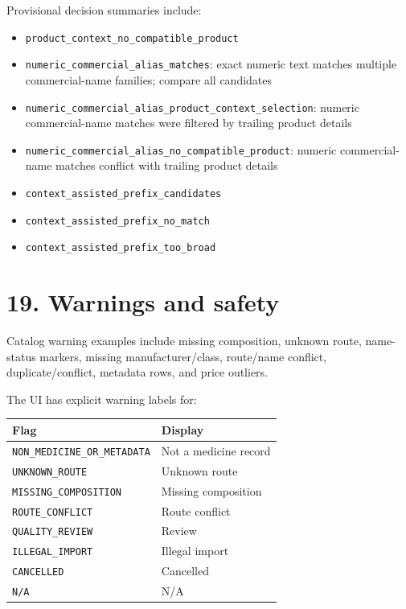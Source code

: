 Provisional decision summaries include:

\begin{itemize}
\tightlist
\item
  \texttt{product\_\allowbreak{}context\_\allowbreak{}no\_\allowbreak{}compatible\_\allowbreak{}product}
\item
  \texttt{numeric\_\allowbreak{}commercial\_\allowbreak{}alias\_\allowbreak{}matches}: exact numeric text matches multiple commercial-name families; compare all candidates
\item
  \texttt{numeric\_\allowbreak{}commercial\_\allowbreak{}alias\_\allowbreak{}product\_\allowbreak{}context\_\allowbreak{}selection}: numeric commercial-name matches were filtered by trailing product details
\item
  \texttt{numeric\_\allowbreak{}commercial\_\allowbreak{}alias\_\allowbreak{}no\_\allowbreak{}compatible\_\allowbreak{}product}: numeric commercial-name matches conflict with trailing product details
\item
  \texttt{context\_\allowbreak{}assisted\_\allowbreak{}prefix\_\allowbreak{}candidates}
\item
  \texttt{context\_\allowbreak{}assisted\_\allowbreak{}prefix\_\allowbreak{}no\_\allowbreak{}match}
\item
  \texttt{context\_\allowbreak{}assisted\_\allowbreak{}prefix\_\allowbreak{}too\_\allowbreak{}broad}
\end{itemize}

\section{19. Warnings and safety}\label{19-warnings-and-safety}

Catalog warning examples include missing composition, unknown route, name-status markers, missing manufacturer/class, route/name conflict, duplicate/conflict, metadata rows, and price outliers.

The UI has explicit warning labels for:

{\def\LTcaptype{none} %
\begin{longtable}[]{@{}>{\RaggedRight\arraybackslash}p{.27\linewidth}>{\RaggedRight\arraybackslash}p{.66\linewidth}@{}}
\toprule\noalign{}
Flag & Display \\
\midrule\noalign{}
\endhead
\bottomrule\noalign{}
\endlastfoot
\texttt{NON\_\allowbreak{}MEDICINE\_\allowbreak{}OR\_\allowbreak{}METADATA} & Not a medicine record \\
\texttt{UNKNOWN\_\allowbreak{}ROUTE} & Unknown route \\
\texttt{MISSING\_\allowbreak{}COMPOSITION} & Missing composition \\
\texttt{ROUTE\_\allowbreak{}CONFLICT} & Route conflict \\
\texttt{QUALITY\_\allowbreak{}REVIEW} & Review \\
\texttt{ILLEGAL\_\allowbreak{}IMPORT} & Illegal import \\
\texttt{CANCELLED} & Cancelled \\
\texttt{N/A} & N/A \\
\end{longtable}
}

